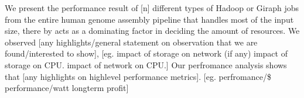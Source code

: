 
We present the performance result of [n] different types of Hadoop or Giraph jobs from the entire human genome assembly pipeline that handles most of the input size, there by acts as a dominating factor in deciding the amount of resources.
We observed [any highlights/general statement on observation that we are found/interested to show],
[eg. 
impact of storage on network (if any)
impact of storage on CPU.
impact of network on CPU.]
Our perfromance analysis shows that [any highlights on highlevel performance metrics].
[eg.
perfromance/\$
performance/watt
longterm profit]
 
